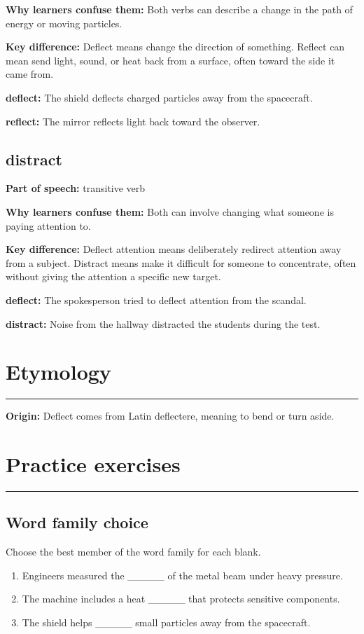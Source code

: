 \documentclass[11pt]{article}
\newcommand{\sectionrule}{\par\vspace{-0.5em}\noindent\textcolor{Accent}{\rule{\linewidth}{0.6pt}}\par}
\begin{document}
\textbf{Why learners confuse them:} Both verbs can describe a change in the path of energy or moving particles.

\textbf{Key difference:} Deflect means change the direction of something. Reflect can mean send light, sound, or heat back from a surface, often toward the side it came from.

\textbf{deflect:} The shield deflects charged particles away from the spacecraft.

\textbf{reflect:} The mirror reflects light back toward the observer.

\subsection{distract}
\textbf{Part of speech:} transitive verb

\textbf{Why learners confuse them:} Both can involve changing what someone is paying attention to.

\textbf{Key difference:} Deflect attention means deliberately redirect attention away from a subject. Distract means make it difficult for someone to concentrate, often without giving the attention a specific new target.

\textbf{deflect:} The spokesperson tried to deflect attention from the scandal.

\textbf{distract:} Noise from the hallway distracted the students during the test.

\section{Etymology}
\sectionrule
\textbf{Origin:} Deflect comes from Latin deflectere, meaning to bend or turn aside.

\section{Practice exercises}
\sectionrule
\subsection{Word family choice}
Choose the best member of the word family for each blank.

\begin{enumerate}
  \item Engineers measured the \_\_\_\_\_ of the metal beam under heavy pressure.
  \item The machine includes a heat \_\_\_\_\_ that protects sensitive components.
  \item The shield helps \_\_\_\_\_ small particles away from the spacecraft.
\end{enumerate}
\end{document}
